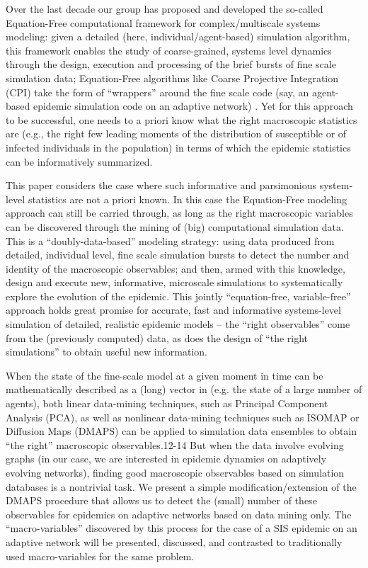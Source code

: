 Over the last decade our group has proposed and developed the
so-called Equation-Free computational framework for complex/multiscale
systems modeling: given a detailed (here, individual/agent-based)
simulation algorithm, this framework enables the study of
coarse-grained, systems level dynamics through the design, execution
and processing of the brief bursts of fine scale simulation data;
Equation-Free algorithms like Coarse Projective Integration (CPI) take
the form of “wrappers” around the fine scale code (say, an agent-based
epidemic simulation code on an adaptive network)
\cite{gear_equation-free_2003,kevrekidis_equation-free:_2004,tsoumanis_coarse-graining_2012,siettos_equation-free_2011}. Yet
for this approach to be successful, one needs to a priori know what
the right macroscopic statistics are (e.g., the right few leading
moments of the distribution of susceptible or of infected individuals
in the population) in terms of which the epidemic statistics can be
informatively summarized.

This paper considers the case where such
informative and parsimonious system-level statistics are not a priori
known.  In this case the Equation-Free modeling approach can still be
carried through, as long as the right macroscopic variables can be
discovered through the mining of (big) computational simulation
data. This is a “doubly-data-based” modeling strategy: using data
produced from detailed, individual level, fine scale simulation bursts
to detect the number and identity of the macroscopic observables; and
then, armed with this knowledge, design and execute new, informative,
microscale simulations to systematically explore the evolution of the
epidemic. This jointly “equation-free, variable-free” approach holds
great promise for accurate, fast and informative systems-level
simulation of detailed, realistic epidemic models – the “right
observables” come from the (previously computed) data, as does the
design of “the right simulations” to obtain useful new information.


When the state of the fine-scale model at a given moment in time can
be mathematically described as a (long) vector in (e.g. the state of a
large number of agents), both linear data-mining techniques, such as
Principal Component Analysis (PCA), as well as nonlinear data-mining
techniques such as ISOMAP or Diffusion Maps (DMAPS) can be applied to
simulation data ensembles to obtain “the right” macroscopic
observables.12-14 But when the data involve evolving graphs (in our
case, we are interested in epidemic dynamics on adaptively evolving
networks), finding good macroscopic observables based on simulation
databases is a nontrivial task. We present a simple
modification/extension of the DMAPS procedure that allows us to detect
the (small) number of these observables for epidemics on adaptive
networks based on data mining only.  The “macro-variables” discovered
by this process for the case of a SIS epidemic on an adaptive network
will be presented, discussed, and contrasted to traditionally used
macro-variables for the same problem.

